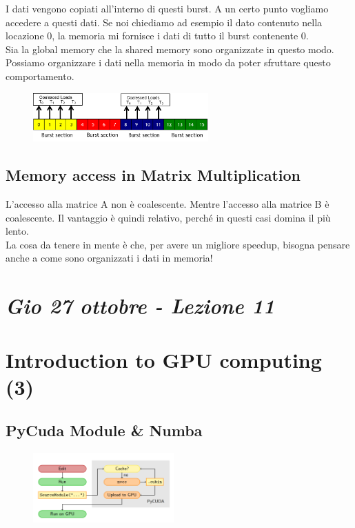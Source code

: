 I dati vengono copiati all'interno di questi burst. A un certo punto vogliamo accedere a questi dati. Se noi chiediamo ad esempio il dato contenuto nella locazione 0, la memoria mi fornisce i dati di tutto il burst contenente 0.\\
Sia la global memory che la shared memory sono organizzate in questo modo. Possiamo organizzare i dati nella memoria in modo da poter sfruttare questo comportamento.

\begin{figure}[ht]
	\centering
	\includegraphics[width=0.6\textwidth]{figure_parallel/memory_coalescing.png}
\end{figure}


\subsection{Memory access in Matrix Multiplication}

L'accesso alla matrice A non è coalescente. Mentre l'accesso alla matrice B è coalescente. Il vantaggio è quindi relativo, perché in questi casi domina il più lento.\\

La cosa da tenere in mente è che,  per avere un migliore speedup, bisogna pensare anche a come sono organizzati i dati in memoria!

\newpage
\section{\textit{Gio 27 ottobre - Lezione 11}}
\section{Introduction to GPU computing (3)}

\subsection{PyCuda Module \& Numba}

\begin{figure}
	\begin{center}
		\includegraphics[width=0.48\textwidth]{figure_parallel/pycuda.png}
	\end{center}
\end{figure}

